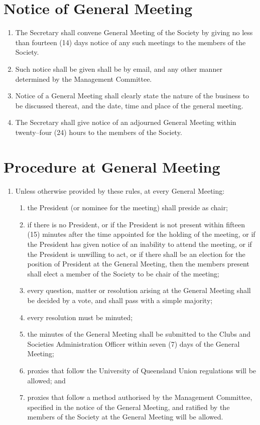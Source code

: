 \documentclass[a4paper]{article}
\begin{document}
\section{Notice of General Meeting}
\begin{enumerate}
\item The Secretary shall convene General Meeting of the Society by giving no less than fourteen (14) days notice of any such meetings to the members of the Society.
\item Such notice shall be given shall be by e\textendash mail, and any other manner determined by the Management Committee.
\item Notice of a General Meeting shall clearly state the nature of the business to be discussed thereat, and the date, time and place of the general meeting.
\item  The Secretary shall give notice of an adjourned General Meeting within twenty--four (24) hours to the members of the Society.
\end{enumerate}

\section{Procedure at General Meeting}
\begin{enumerate}
\item Unless otherwise provided by these rules, at every General Meeting:
	\begin{enumerate}
	\item the President (or nominee for the meeting) shall preside as chair;
	\item if there is no President, or if the President is not present within fifteen (15) minutes after the time appointed for the holding of the meeting, or if the President has given notice of an inability to attend the meeting, or if the President is unwilling to act, or if there shall be an election for the position of President at the General Meeting, then the members present shall elect a member of the Society to be chair of the meeting;
	\item every question, matter or resolution arising at the General Meeting shall be decided by a vote, and shall pass with a simple majority;
	\item every resolution must be minuted;
	\item the minutes of the General Meeting shall be submitted to the Clubs and Societies Administration Officer within seven (7) days of the General Meeting;
	\item proxies that follow the University of Queensland Union regulations will be allowed; and
	\item proxies that follow a method authorised by the Management Committee, specified in the notice of the General Meeting, and ratified by the members of the Society at the General Meeting will be allowed.
	\end{enumerate}
\end{enumerate}
\end{document}

